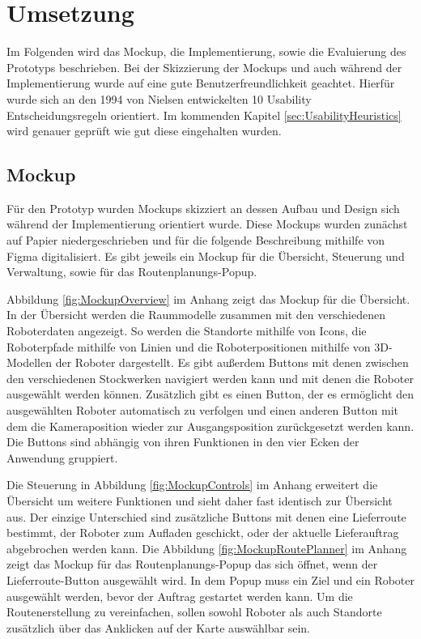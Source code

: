 
\newpage
\section{Umsetzung}
Im Folgenden wird das Mockup, die Implementierung, sowie die Evaluierung des Prototyps beschrieben. Bei der Skizzierung der Mockups und auch während der Implementierung wurde auf eine gute Benutzerfreundlichkeit geachtet. Hierfür wurde sich an den 1994 von Nielsen entwickelten 10 Usability Entscheidungsregeln \cite{Nielsen.1994} orientiert. Im kommenden Kapitel \ref{sec:UsabilityHeuristics} wird genauer geprüft wie gut diese eingehalten wurden.

\subsection{Mockup}\label{sec:Mockup}
Für den Prototyp wurden Mockups skizziert an dessen Aufbau und Design sich während der Implementierung orientiert wurde. Diese Mockups wurden zunächst auf Papier niedergeschrieben und für die folgende Beschreibung mithilfe von Figma \cite{Figma} digitalisiert. Es gibt jeweils ein Mockup für die Übersicht, Steuerung und Verwaltung, sowie für das Routenplanungs-Popup.

Abbildung \ref{fig:MockupOverview} im Anhang zeigt das Mockup für die Übersicht. In der Übersicht werden die Raummodelle zusammen mit den verschiedenen Roboterdaten angezeigt. So werden die Standorte mithilfe von Icons, die Roboterpfade mithilfe von Linien und die Roboterpositionen mithilfe von 3D-Modellen der Roboter dargestellt. Es gibt außerdem Buttons mit denen zwischen den verschiedenen Stockwerken navigiert werden kann und mit denen die Roboter ausgewählt werden können. Zusätzlich gibt es einen Button, der es ermöglicht den ausgewählten Roboter automatisch zu verfolgen und einen anderen Button mit dem die Kameraposition wieder zur Ausgangsposition zurückgesetzt werden kann. Die Buttons sind abhängig von ihren Funktionen in den vier Ecken der Anwendung gruppiert.

Die Steuerung in Abbildung \ref{fig:MockupControls} im Anhang erweitert die Übersicht um weitere Funktionen und sieht daher fast identisch zur Übersicht aus. Der einzige Unterschied sind zusätzliche Buttons mit denen eine Lieferroute bestimmt, der Roboter zum Aufladen geschickt, oder der aktuelle Lieferauftrag abgebrochen werden kann. Die Abbildung \ref{fig:MockupRoutePlanner} im Anhang zeigt das Mockup für das Routenplanungs-Popup das sich öffnet, wenn der Lieferroute-Button ausgewählt wird. In dem Popup muss ein Ziel und ein Roboter ausgewählt werden, bevor der Auftrag gestartet werden kann. 
Um die Routenerstellung zu vereinfachen, sollen sowohl Roboter als auch Standorte zusätzlich über das Anklicken auf der Karte auswählbar sein.


